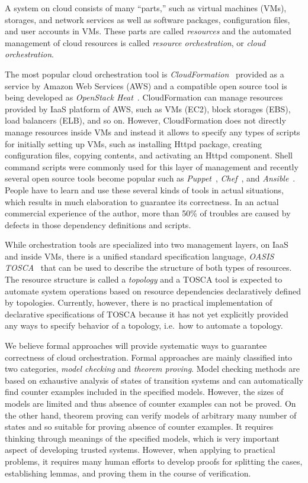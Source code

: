 \documentclass[12pt]{report}
\begin{document}
A system on cloud consists of many ``parts,'' such as virtual machines
(VMs), storages, and network services as well as software packages,
configuration files, and user accounts in VMs. These parts are called
{\it resources} and the automated management of cloud resources is
called {\it resource orchestration}, or {\it cloud orchestration}.

The most popular cloud orchestration tool is {\it
  CloudFormation}~\cite{CloudFormation} provided as a service by
Amazon Web Services (AWS) and a compatible open source tool is being
developed as {\it OpenStack Heat}~\cite{Heat}. CloudFormation can
manage resources provided by IaaS platform of AWS, such as VMs (EC2),
block storages (EBS), load balancers (ELB), and so on. However,
CloudFormation does not directly manage resources inside VMs and
instead it allows to specify any types of scripts for initially
setting up VMs, such as installing Httpd package, creating
configuration files, copying contents, and activating an Httpd
component. Shell command scripts were commonly used for this layer of
management and recently several open source tools become popular such
as {\it Puppet}~\cite{Puppet}, {\it Chef}~\cite{Chef}, and {\it
  Ansible}~\cite{Ansible}. People have to learn and use these
several kinds of tools in actual situations, which results in much
elaboration to guarantee its correctness. In an actual commercial
experience of the author, more than 50\% of troubles are caused by
defects in those dependency definitions and scripts.

While orchestration tools are specialized into two management layers,
on IaaS and inside VMs, there is a unified standard specification
language, {\it OASIS TOSCA}~\cite{TOSCA} that can be used to describe
the structure of both types of resources. The resource structure is
called a {\it topology} and a TOSCA tool is expected to automate
system operations based on resource dependencies declaratively defined
by topologies.  Currently, however, there is no practical
implementation of declarative specifications of TOSCA because it has
not yet explicitly provided any ways to specify behavior of a topology,
i.e.\ how to automate a topology.

We believe formal approaches will provide systematic ways to guarantee
correctness of cloud orchestration. Formal approaches are mainly
classified into two categories, {\it model checking} and {\it theorem
  proving}. Model checking methods are based on exhaustive analysis of
states of transition systems and can automatically find counter
examples included in the specified models. However, the sizes of models
are limited and thus absence of counter examples can not be proved.
On the other hand, theorem proving can verify models of arbitrary many
number of states and so suitable for proving absence of counter
examples. It requires thinking through meanings of the specified
models, which is very important aspect of developing trusted
systems. However, when applying to practical problems, it requires many
human efforts to develop proofs for splitting the cases, establishing
lemmas, and proving them in the course of verification.
\end{document}

